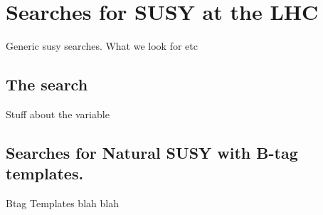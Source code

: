 \chapter{Searches for SUSY at the LHC}
\label{chap:SUSYsearches}

Generic susy searches. What we look for etc

\section{The \alphat search}
\label{sec:alphatintroduction}

Stuff about the \alphat variable


\section{Searches for Natural SUSY with B-tag templates.}
\label{sec:templatemethod}

Btag Templates blah blah


